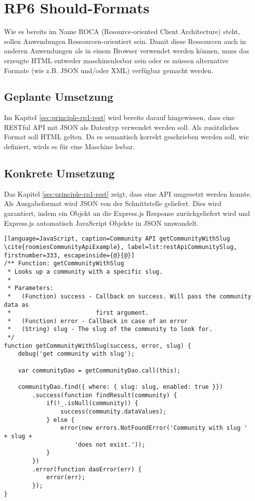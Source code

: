 \section{RP6 Should-Formats}
\label{sec:principle-rp6-should-formats}
Wie es bereits im Name ROCA (Resource-oriented Client Architecture) steht, sollen Anwendungen Ressourcen-orientiert sein. Damit diese Ressourcen auch in anderen Anwendungen als in einem Browser verwendet werden können, muss das erzeugte HTML entweder maschinenlesbar sein oder es müssen alternative Formate (wie z.B. JSON und/oder XML) verfügbar gemacht werden.

\subsection*{Geplante Umsetzung}
Im Kapitel \ref{sec:principle-rp1-rest}  wird bereits darauf hingewiesen, dass eine RESTful API mit JSON als Datentyp verwendet werden soll.
Als zusätzliches Format soll HTML gelten. Da es semantisch korrekt geschrieben werden soll, wie  definiert, wirds es für eine Maschine lesbar.

\subsection*{Konkrete Umsetzung}
Das Kapitel \ref{sec:principle-rp1-rest}  zeigt, dass eine API umgesetzt werden konnte.
Als Ausgabeformat wird JSON von der Schnittstelle geliefert. Dies wird garantiert, indem ein Objekt an die Express.js Response \cite{ExpressjsResSend} zurückgeliefert wird und Express.js automatisch JavaScript Objekte in JSON umwandelt.

\begin{lstlisting}[language=JavaScript, caption=Community API getCommunityWithSlug \cite{roomiesCommunityApiExample}, label=lst:restApiCommunitySlug, firstnumber=333, escapeinside={@}{@}]
/** Function: getCommunityWithSlug
 * Looks up a community with a specific slug.
 *
 * Parameters:
 *   (Function) success - Callback on success. Will pass the community data as
 *                        first argument.
 *   (Function) error - Callback in case of an error
 *   (String) slug - The slug of the community to look for.
 */
function getCommunityWithSlug(success, error, slug) {
	debug('get community with slug');

	var communityDao = getCommunityDao.call(this);

	communityDao.find({ where: { slug: slug, enabled: true }})
		.success(function findResult(community) {
			if(!_.isNull(community)) {
				success(community.dataValues);
			} else {
				error(new errors.NotFoundError('Community with slug ' + slug +
					'does not exist.'));
			}
		})
		.error(function daoError(err) {
			error(err);
		});
}
\end{lstlisting}

